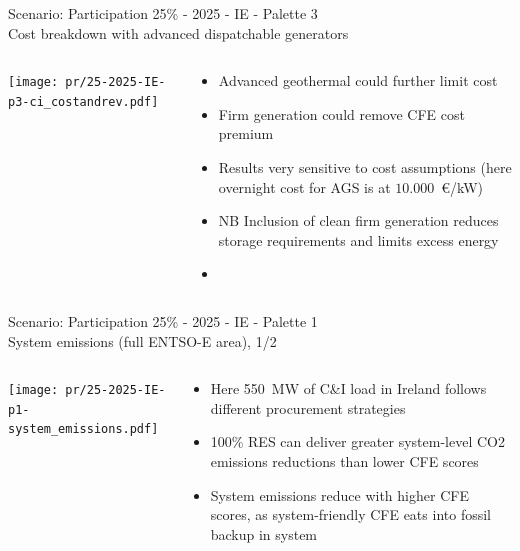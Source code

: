 \begin{frame}{Scenario: Participation 25\% - 2025 - IE - Palette 3 \\
Cost breakdown with advanced dispatchable generators}

\begin{columns}[T]
\begin{column}{9cm}
\centering

\texttt{[image: pr/25-2025-IE-p3-ci\_costandrev.pdf]}
\end{column}
\begin{column}{5cm}


  \begin{itemize}
  \item Advanced geothermal could \alert{further limit cost}
  \item Firm generation could \alert{remove CFE cost premium}
  \item Results very \alert{sensitive} to cost assumptions (here overnight cost for AGS is at $10.000$~€/kW)
  \item NB Inclusion of clean firm generation reduces storage requirements and limits excess energy
  \item 
  \end{itemize}
\end{column}
\end{columns}

\end{frame}



\begin{frame}{Scenario: Participation 25\% - 2025 - IE - Palette 1 \\
System emissions (full ENTSO-E area),  1/2}

\begin{columns}[T]
\begin{column}{9cm}
\centering

\texttt{[image: pr/25-2025-IE-p1-system\_emissions.pdf]}
\end{column}
\begin{column}{5cm}

  \begin{itemize}
   \item  Here 550~MW of C\&I load in Ireland follows different procurement strategies
   \item 100\% RES can deliver greater system-level CO2 emissions reductions than lower CFE scores
   \item \alert{System emissions reduce} with higher CFE scores, as system-friendly CFE eats into fossil backup in system

  \end{itemize}
\end{column}
\end{columns}

\end{frame}


